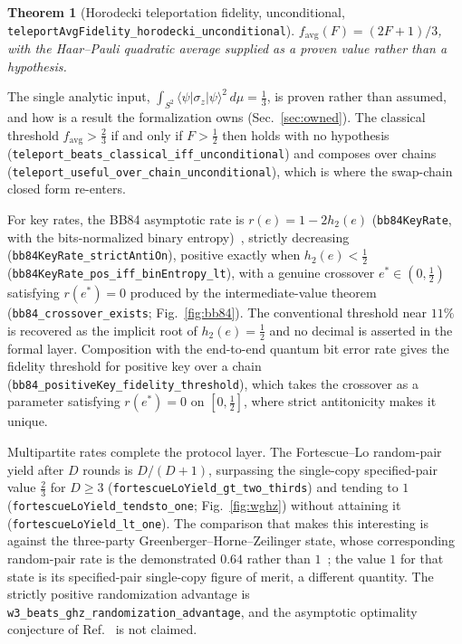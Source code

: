 \documentclass[aps,pra,reprint,nofootinbib,superscriptaddress]{revtex4-2}
\theoremstyle{plain}
\newtheorem{theorem}{Theorem}
\theoremstyle{definition}
\theoremstyle{remark}
\newcommand{\lean}[1]{\texttt{#1}}
\begin{document}
\begin{theorem}[Horodecki teleportation fidelity, unconditional,
\lean{teleportAvgFidelity\_horodecki\_unconditional}]
\label{thm:teleport}
$f_{\mathrm{avg}}(F) = (2F+1)/3$, with the Haar--Pauli quadratic average
supplied as a proven value rather than a hypothesis.
\end{theorem}

The single analytic input,
$\int_{S^2}\langle\psi|\sigma_z|\psi\rangle^2\,d\mu = \tfrac13$, is
proven rather than assumed, and how is a result the formalization owns
(Sec.~\ref{sec:owned}). The classical threshold
$f_{\mathrm{avg}} > \tfrac23$ if and only if $F > \tfrac12$ then holds
with no hypothesis
(\lean{teleport\_beats\_classical\_iff\_unconditional}) and composes over
chains (\lean{teleport\_useful\_over\_chain\_unconditional}), which is
where the swap-chain closed form re-enters.

For key rates, the BB84 asymptotic rate is $r(e) = 1 - 2h_2(e)$
(\lean{bb84KeyRate}, with the bits-normalized binary
entropy)~\cite{BB84,ShorPreskill2000}, strictly decreasing
(\lean{bb84KeyRate\_strictAntiOn}), positive exactly when
$h_2(e) < \tfrac12$ (\lean{bb84KeyRate\_pos\_iff\_binEntropy\_lt}), with
a genuine crossover $e^* \in (0,\tfrac12)$ satisfying $r(e^*) = 0$
produced by the intermediate-value theorem
(\lean{bb84\_crossover\_exists}; Fig.~\ref{fig:bb84}). The conventional
threshold near $11\%$ is recovered as the implicit root of
$h_2(e) = \tfrac12$ and no decimal is asserted in the formal layer.
Composition with the end-to-end quantum bit error rate gives the fidelity
threshold for positive key over a chain
(\lean{bb84\_positiveKey\_fidelity\_threshold}), which takes the
crossover as a parameter satisfying $r(e^*) = 0$ on $[0,\tfrac12]$, where
strict antitonicity makes it unique.

Multipartite rates complete the protocol layer. The Fortescue--Lo
random-pair yield after $D$ rounds is $D/(D+1)$, surpassing the
single-copy specified-pair value $\tfrac23$ for $D \ge 3$
(\lean{fortescueLoYield\_gt\_two\_thirds}) and tending to $1$
(\lean{fortescueLoYield\_tendsto\_one}; Fig.~\ref{fig:wghz}) without
attaining it (\lean{fortescueLoYield\_lt\_one}). The comparison that
makes this interesting is against the three-party
Greenberger--Horne--Zeilinger state, whose corresponding random-pair rate
is the demonstrated $0.64$ rather than $1$~\cite{FortescueLo2007}; the
value $1$ for that state is its specified-pair single-copy figure of
merit, a different quantity. The strictly positive randomization
advantage is \lean{w3\_beats\_ghz\_randomization\_advantage}, and the
asymptotic optimality conjecture of Ref.~\cite{FortescueLo2007} is not
claimed.
\end{document}
